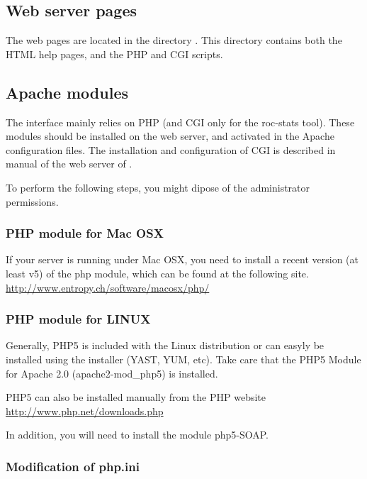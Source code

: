 \documentclass{book}
\begin{document}
\subsection{Web server pages}

The web pages are located in the directory
. This directory contains both the HTML help
pages, and the PHP and CGI scripts.

\subsection{Apache modules}

The \neat interface mainly relies on PHP (and CGI only for the roc-stats tool).
These modules should be installed on the web server, and activated in the Apache configuration files.
The installation and configuration of CGI is described in manual of the web server of \RSAT.

To perform the following steps, you might dipose of the administrator permissions.

\subsubsection{PHP module for Mac OSX}

If your server is running under Mac OSX, you need to install a recent
version (at least v5) of the php module, which can be found at the
following site. \\
\url{http://www.entropy.ch/software/macosx/php/}

\subsubsection{PHP module for LINUX}

Generally, PHP5 is included with the Linux distribution or can easyly
be installed using the installer (YAST, YUM, etc). Take care that the
PHP5 Module for Apache 2.0 (apache2-mod\_php5) is installed.

PHP5 can also be installed manually from the PHP website \\
\url{http://www.php.net/downloads.php}

In addition, you will need to install the module php5-SOAP.

\subsubsection{Modification of php.ini}
\end{document}
